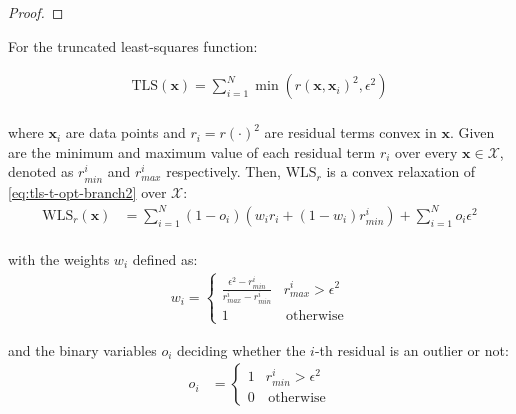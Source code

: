 \begin{proof}
\end{proof}

\begin{theorem}
	
	For the truncated least-squares function:
	
	\begin{equation}
		\label{eq:tls-t-opt-branch2}
		\begin{aligned}
			\text{TLS}(\mathbf{x}) = \sum_{i=1}^{N} \min \left(r(\mathbf{x}, \mathbf{x}_i)^2, \epsilon^2 \right)\\
		\end{aligned}
	\end{equation}
	
	where $\mathbf{x}_i$ are data points and $r_i = r(\cdot)^2$ are residual terms convex in $\mathbf{x}$. Given are the minimum and maximum value of each residual term $r_i$ over every $\mathbf{x} \in \mathcal{X}$, denoted as $r_{min}^i$ and $r_{max}^i$ respectively. Then, $\text{WLS}_{r}$ is a convex relaxation of \ref{eq:tls-t-opt-branch2} over $\mathcal{X}$:
	\begin{equation}
		\label{eq:tls-wls-relaxation}
		\begin{aligned}	
			\text{WLS}_{r}(\mathbf{x}) &= 
			\sum_{i=1}^{N} (1 - o_i) \left(w_i r_i  + (1 - w_i) r_{min}^i \right) + \sum_{i=1}^{N} o_i\epsilon^2\\
		\end{aligned}
	\end{equation}
	
	with the weights $w_i$ defined as:
	\begin{equation}
		\begin{aligned}	
			w_i  = 
			\begin{cases}
				\frac{\epsilon^2 - r_{min}^i}{r_{max}^i - r_{min}^i} &  r_{max}^i > \epsilon^2\\
				1 & \, \text{otherwise}
			\end{cases}
		\end{aligned}
	\end{equation}
	
	and the binary variables $o_i$ deciding whether the $i$-th residual is an outlier or not:
	\begin{equation}
		\begin{aligned}	
			o_i &= \begin{cases}
				1 &  r_{min}^i > \epsilon^2\\
				0 & \, \text{otherwise}
			\end{cases}
		\end{aligned}
	\end{equation}
	
\end{theorem}	

